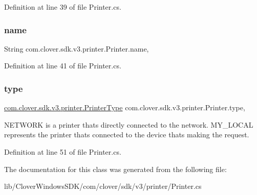 Definition at line 39 of file Printer.\+cs.

\mbox{\label{classcom_1_1clover_1_1sdk_1_1v3_1_1printer_1_1_printer_a05efe88ab5923d18ab62cb78f958e083}} 
\subsubsection{\texorpdfstring{name}{name}}
{\footnotesize\ttfamily String com.\+clover.\+sdk.\+v3.\+printer.\+Printer.\+name\hspace{0.3cm}{\ttfamily [get]}, {\ttfamily [set]}}



Definition at line 41 of file Printer.\+cs.

\mbox{\label{classcom_1_1clover_1_1sdk_1_1v3_1_1printer_1_1_printer_ab36bf7ec4bd09ce0ee2562f26b79475c}} 
\subsubsection{\texorpdfstring{type}{type}}
{\footnotesize\ttfamily \hyperlink{namespacecom_1_1clover_1_1sdk_1_1v3_1_1printer_aaa495f52394f8a733ba9bb4650cb1583}{com.\+clover.\+sdk.\+v3.\+printer.\+Printer\+Type} com.\+clover.\+sdk.\+v3.\+printer.\+Printer.\+type\hspace{0.3cm}{\ttfamily [get]}, {\ttfamily [set]}}



N\+E\+T\+W\+O\+RK is a printer that\textquotesingle{}s directly connected to the network. M\+Y\+\_\+\+L\+O\+C\+AL represents the printer that\textquotesingle{}s connected to the device that\textquotesingle{}s making the request. 



Definition at line 51 of file Printer.\+cs.



The documentation for this class was generated from the following file\+:\begin{DoxyCompactItemize}
\item 
lib/\+Clover\+Windows\+S\+D\+K/com/clover/sdk/v3/printer/Printer.\+cs\end{DoxyCompactItemize}
